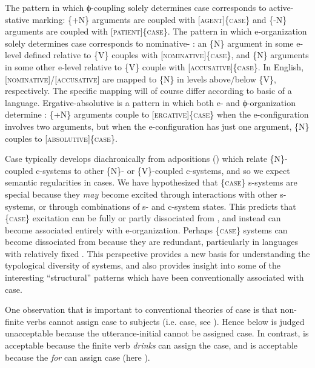   The pattern in which ϕ-coupling solely determines case corresponds to active-stative marking: \{+N\} arguments are coupled with [\textsc{agent}]\{\textsc{case}\} and \{-N\} arguments are coupled with [\textsc{patient}]\{\textsc{case}\}. The pattern in which e-organization solely determines case corresponds to nominative- : an \{N\} argument in some e-level defined relative to \{V\} couples with [\textsc{nominative}]\linebreak\{\textsc{case}\}, and \{N\} arguments in some other e-level relative to \{V\} couple with [\textsc{ac\-cu\-sa\-tive}]\{\textsc{case\}}. In English, [\textsc{nominative}]/[\textsc{accusative}] are mapped to \{N\} in levels above/below \{V\}, respectively. The specific mapping will of course differ according to basic  of a language. Ergative-absolutive is a pattern in which both e- and ϕ-organization determine : \{+N\} arguments couple to [\textsc{ergative}]\{\textsc{case}\} when the e-configuration involves two arguments, but when the e-configuration has just one argument, \{N\} couples to [\textsc{absolutive}]\{\textsc{case}\}.

  Case typically develops diachronically from adpositions (\citealt{Heine2009,TraugottHeine1991}) which relate \{N\}-coupled c-systems to other \{N\}- or \{V\}-coupled c-systems, and so we expect semantic regularities in cases. We have hypothesized that \{\textsc{case}\} s-systems are special because they \textit{may} become excited through interactions with other s-systems, or through combinations of s- and c-system states. This predicts that \{\textsc{case}\} excitation can be fully or partly dissociated from , and instead can become associated entirely with e-organization. Perhaps \{\textsc{case}\} systems can become dissociated from  because they are redundant, particularly in languages with relatively fixed . This perspective provides a new basis for understanding the typological diversity of  systems, and also provides insight into some of the interesting “structural” patterns which have been conventionally associated with case. 

  One observation that is important to conventional theories of case is that non-finite verbs cannot assign case to subjects (i.e.  case, see \citealt{Chomsky1980,ChomskyLasnik1977,Vergnaud2006}). Hence  below is judged unacceptable because the utterance-initial  cannot be assigned case. In contrast,  is acceptable because the finite verb \textit{drinks} can assign the  case, and  is acceptable because the  \textit{for} can assign case (here ).

